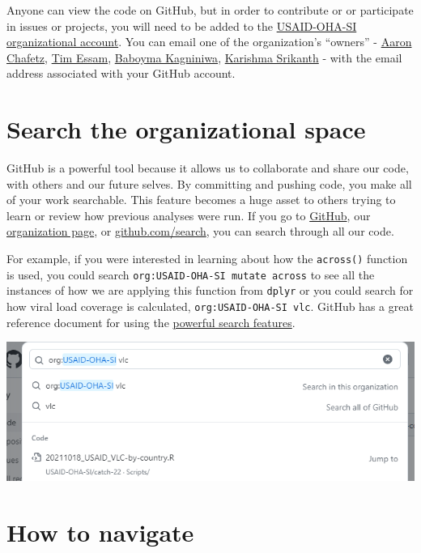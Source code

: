 \documentclass[
  letterpaper,
  DIV=11,
  numbers=noendperiod]{scrreprt}
\begin{document}
Anyone can view the code on GitHub, but in order to contribute or or
participate in issues or projects, you will need to be added to the
\href{https://github.com/USAID-OHA-SI}{USAID-OHA-SI organizational
account}. You can email one of the organization's ``owners'' -
\href{mailto:achafetz@usaid.gov}{Aaron Chafetz},
\href{mailto:tessam@usaid.gov}{Tim Essam},
\href{mailto:bkagniniwa@usaid.gov}{Baboyma Kagniniwa},
\href{mailto:ksrikanth@usaid.gov}{Karishma Srikanth} - with the email
address associated with your GitHub account.

\hypertarget{search-the-organizational-space}{%
\section{Search the organizational
space}\label{search-the-organizational-space}}

GitHub is a powerful tool because it allows us to collaborate and share
our code, with others and our future selves. By committing and pushing
code, you make all of your work searchable. This feature becomes a huge
asset to others trying to learn or review how previous analyses were
run. If you go to \href{github.com}{GitHub}, our
\href{https://github.com/USAID-OHA-SI}{organization page}, or
\url{github.com/search}, you can search through all our code.

For example, if you were interested in learning about how the
\texttt{across()} function is used, you could search
\texttt{org:USAID-OHA-SI\ mutate\ across} to see all the instances of
how we are applying this function from \texttt{dplyr} or you could
search for how viral load coverage is calculated,
\texttt{org:USAID-OHA-SI\ vlc}. GitHub has a great reference document
for using the
\href{https://docs.github.com/en/search-github/github-code-search/understanding-github-code-search-syntax}{powerful
search features}.

\includegraphics{./images/image9 - powerfull search.png}

\hypertarget{how-to-navigate}{%
\section{How to navigate}\label{how-to-navigate}}
\end{document}
